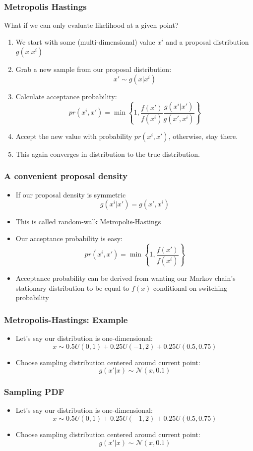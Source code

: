 \documentclass{beamer}
\begin{document}
\begin{frame}
\frametitle[alignment=center]{Metropolis Hastings}
What if we can only evaluate likelihood at a given point?
\begin{enumerate}
\bigskip
\item We start with some (multi-dimensional) value $x^{i}$ and a proposal distribution $g(x|x^{i})$
\bigskip
\item Grab a new sample from our proposal distribution:
$$x'\sim g(x|x^i)$$
\item Calculate acceptance probability:
$$pr(x^i,x')=\min\left\{1,\frac{f(x')}{f(x^i)}\frac{g(x^i|x')}{g(x',x^i)}\right\}$$
\item Accept the new value with probability $pr(x^i,x')$, otherwise, stay there.
\bigskip
\item This again converges in distribution to the true distribution.
\end{enumerate}
\end{frame}

\begin{frame}
\frametitle[alignment=center]{A convenient proposal density}
\begin{itemize}
\item If our proposal density is symmetric
$$g(x^i|x')=g(x',x^i)$$
\item This is called random-walk Metropolis-Hastings
\bigskip
\item Our acceptance probability is easy:
$$pr(x^i,x')=\min\left\{1,\frac{f(x')}{f(x^i)}\right\}$$
\item Acceptance probability can be derived from wanting our Markov chain's stationary distribution to be equal to $f(x)$ conditional on switching probability
\end{itemize}
\end{frame}

\begin{frame}
\frametitle[alignment=center]{Metropolis-Hastings: Example}
\begin{itemize}
\item Let's say our distribution is one-dimensional:
$$x\sim0.5U(0,1)+0.25U(-1,2)+0.25U(0.5,0.75)$$
\item Choose sampling distribution centered around current point:
$$g(x'|x)\sim\mathcal{N}(x,0.1)$$
\end{itemize}
\end{frame}

\begin{frame}
\frametitle[alignment=center]{Sampling PDF}
\begin{itemize}
\item Let's say our distribution is one-dimensional:
$$x\sim0.5U(0,1)+0.25U(-1,2)+0.25U(0.5,0.75)$$
\item Choose sampling distribution centered around current point:
$$g(x'|x)\sim\mathcal{N}(x,0.1)$$
\end{itemize}
\end{frame}
\end{document}
